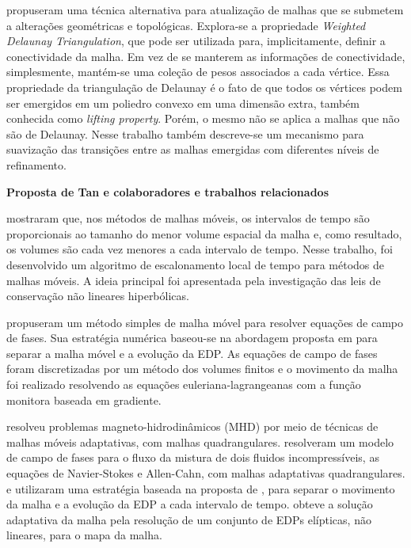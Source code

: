 propuseram uma técnica alternativa para atualização de malhas que se submetem a alterações geométricas e topológicas. Explora-se a propriedade {\it Weighted Delaunay Triangulation}, que pode ser utilizada para, implicitamente, definir a conectividade da malha. Em vez de se manterem as informações de conectividade, simplesmente, mantém-se uma coleção de pesos associados a cada vértice. Essa propriedade da triangulação de Delaunay é o fato de que todos os vértices podem ser emergidos em um poliedro convexo em uma dimensão extra, também conhecida como {\it lifting property}. Porém, o mesmo não se aplica a malhas que não são de Delaunay. Nesse trabalho também descreve-se um mecanismo para suavização das transições entre as malhas emergidas com diferentes níveis de refinamento. %

\textbf{Proposta de Tan e colaboradores e trabalhos relacionados}
\label{subcap_proposta_tan_colaboradores}

 mostraram que, nos métodos de malhas móveis, os intervalos de tempo são proporcionais ao tamanho do menor volume espacial da malha e, como resultado, os volumes são cada vez menores a cada intervalo de tempo. Nesse trabalho, foi desenvolvido um algoritmo de escalonamento local de tempo para métodos de malhas móveis. A ideia principal foi apresentada pela investigação das leis de conservação não lineares hiperbólicas. 

 propuseram um método simples de malha móvel para resolver equações de campo de fases. Sua estratégia numérica baseou-se na abordagem proposta em  para separar a malha móvel e a evolução da EDP. As equações de campo de fases foram discretizadas por um método dos volumes finitos e o movimento da malha foi realizado resolvendo as equações euleriana-lagrangeanas com a função monitora baseada em gradiente.

 resolveu problemas magneto-hidrodinâmicos (MHD) por meio de técnicas de malhas móveis adaptativas, com malhas quadrangulares.  resolveram um modelo de campo de fases para o fluxo da mistura de dois fluidos incompressíveis, as equações de Navier-Stokes e Allen-Cahn, com malhas adaptativas quadrangulares.  e  utilizaram uma estratégia baseada na proposta de , para separar o movimento da malha e a evolução da EDP a cada intervalo de tempo.  obteve a solução adaptativa da malha pela resolução de um conjunto de EDPs elípticas, não lineares, para o mapa da malha.

